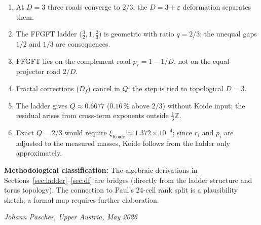 \begin{enumerate}
  \item At \(D = 3\) three roads converge to \(2/3\);
        the \(D = 3+\varepsilon\) deformation separates them.
  \item The FFGFT ladder
        \(\bigl(\tfrac{3}{2}, 1, \tfrac{2}{3}\bigr)\)
        is geometric with ratio \(q = 2/3\);
        the unequal gaps \(1/2\) and \(1/3\) are consequences.
  \item FFGFT lies on the complement road
        \(p_\tau = 1 - 1/D\), not on the equal-projector road \(2/D\).
  \item Fractal corrections (\(D_f\)) cancel in \(Q\);
        the step is tied to topological \(D = 3\).
  \item The ladder gives \(Q \approx 0.6677\)
        (\(0.16\,\%\) above \(2/3\)) without Koide input;
        the residual arises from cross-term exponents outside
        \(\tfrac{1}{3}\mathbb{Z}\).
  \item Exact \(Q = 2/3\) would require
        \(\xi_{\text{Koide}} \approx 1.372\times10^{-4}\);
        since \(r_i\) and \(p_i\) are adjusted to the measured masses,
        Koide follows from the ladder only approximately.
\end{enumerate}

\bigskip
\noindent
\textbf{Methodological classification:}
The algebraic derivations in Sections~\ref{sec:ladder}--\ref{sec:df}
are bridges (directly from the ladder structure and torus topology).
The connection to Paul's 24-cell rank split is a plausibility sketch;
a formal map requires further elaboration.

\bigskip
\begin{flushright}
\textit{Johann Pascher, Upper Austria, May 2026}
\end{flushright}

